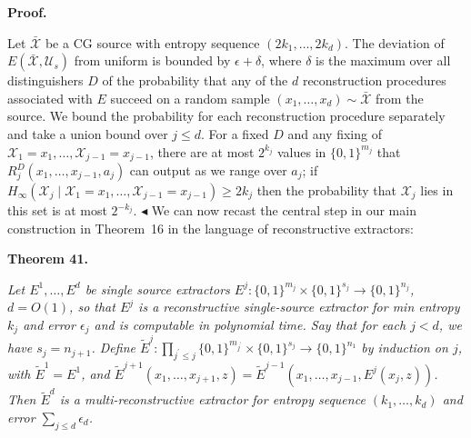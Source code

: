 


\par\medskip\noindent\textbf{Proof.}\par




Let $\bar{\mathcal{X}}$ be a CG source with entropy sequence $(2k_{1},\ldots,2k_{d})$. The deviation of $E(\bar{\mathcal{X}},\mathcal{U}_{s})$ from uniform is bounded by $\epsilon+\delta$, where $\delta$ is the maximum over all distinguishers $D$ of the probability that any of the $d$ reconstruction procedures associated with $E$ succeed on a random sample $(x_{1},\ldots,x_{d})\sim\bar{\mathcal{X}}$ from the source. We bound the probability for each reconstruction procedure separately and take a union bound over $j\leq d$. For a fixed $D$ and any fixing of $\mathcal{X}_{1}=x_{1},\ldots,\mathcal{X}_{j-1}=x_{j-1}$, there are at most $2^{k_{j}}$ values in $\{0,1\}^{m_{j}}$ that $R_{j}^{D}(x_{1},\ldots,x_{j-1},a_{j})$ can output as we range over $a_{j}$; if $H_{\infty}(\mathcal{X}_{j}\mid\mathcal{X}_{1}=x_{1},\ldots,\mathcal{X}_{j-1}=x_{j-1})\geq 2k_{j}$ then the probability that $\mathcal{X}_{j}$ lies in this set is at most $2^{-k_{j}}$.
$\blacktriangleleft$
We can now recast the central step in our main construction in Theorem 16 in the language of reconstructive extractors:\par





\par\medskip\noindent\textbf{
\textbf{Theorem 41}\textbf{.}
}\par



\emph{Let $E^{1},\ldots,E^{d}$ be single source extractors $E^{j}:\{0,1\}^{m_{j}}\times\{0,1\}^{s_{j}}\to\{0,1\}^{n_{j}}$, $d=O(1)$, so that $E^{j}$ is a reconstructive single-source extractor for min entropy $k_{j}$ and error $\epsilon_{j}$ and is computable in polynomial time. Say that for each $j<d$, we have $s_{j}=n_{j+1}$. Define $\tilde{E}^{j}:\prod_{j^{\prime}\leq j}\{0,1\}^{m_{j^{\prime}}}\times\{0,1\}^{s_{j}}\to\{0,1\}^{n_{1}}$ by induction on $j$, with $\tilde{E}^{1}=E^{1}$, and $\tilde{E}^{j+1}(x_{1},\ldots,x_{j+1},z)=\tilde{E}^{j-1}(x_{1},\ldots,x_{j-1},E^{j}(x_{j},z))$. Then $\tilde{E}^{d}$ is a multi-reconstructive extractor for entropy sequence $(k_{1},\ldots,k_{d})$ and error $\sum_{j\leq d}\epsilon_{d}$.}\par



